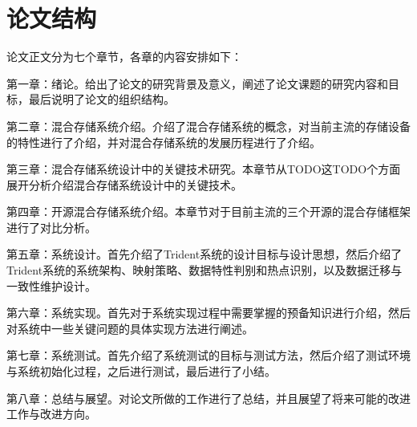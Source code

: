 \section{论文结构}

论文正文分为七个章节，各章的内容安排如下： 

第一章：绪论。给出了论文的研究背景及意义，阐述了论文课题的研究内容和目标，最后说明了论文的组织结构。 

第二章：混合存储系统介绍。介绍了混合存储系统的概念，对当前主流的存储设备的特性进行了介绍，并对混合存储系统的发展历程进行了介绍。 

第三章：混合存储系统设计中的关键技术研究。本章节从TODO这TODO个方面展开分析介绍混合存储系统设计中的关键技术。 

第四章：开源混合存储系统介绍。本章节对于目前主流的三个开源的混合存储框架进行了对比分析。

第五章：系统设计。首先介绍了Trident系统的设计目标与设计思想，然后介绍了Trident系统的系统架构、映射策略、数据特性判别和热点识别，以及数据迁移与一致性维护设计。 

第六章：系统实现。首先对于系统实现过程中需要掌握的预备知识进行介绍，然后对系统中一些关键问题的具体实现方法进行阐述。 

第七章：系统测试。首先介绍了系统测试的目标与测试方法，然后介绍了测试环境与系统初始化过程，之后进行测试，最后进行了小结。 

第八章：总结与展望。对论文所做的工作进行了总结，并且展望了将来可能的改进工作与改进方向。

